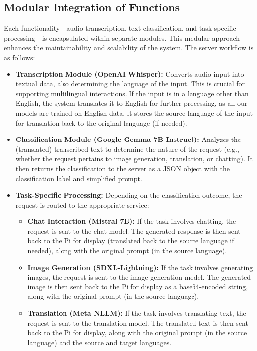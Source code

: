 \documentclass[12pt]{article}
\begin{document}
\subsection{Modular Integration of Functions}
Each functionality—audio transcription, text classification, and task-specific processing—is encapsulated within separate modules. This modular approach enhances the maintainability and scalability of the system. The server workflow is as follows:
\begin{itemize}
    \item \textbf{Transcription Module (OpenAI Whisper):} Converts audio input into textual data, also determining the language of the input. This is crucial for supporting multilingual interactions. If the input is in a language other than English, the system translates it to English for further processing, as all our models are trained on English data. It stores the source language of the input for translation back to the original language (if needed).\cite{radford2022whisper}
    \item \textbf{Classification Module (Google Gemma 7B Instruct):} Analyzes the (translated) transcribed text to determine the nature of the request (e.g., whether the request pertains to image generation, translation, or chatting). It then returns the classification to the server as a JSON object with the classification label and simplified prompt.\cite{gemmateam2024gemma}
    \item \textbf{Task-Specific Processing:} Depending on the classification outcome, the request is routed to the appropriate service:
    \begin{itemize}
		\item \textbf{Chat Interaction (Mistral 7B):} If the task involves chatting, the request is sent to the chat model. The generated response is then sent back to the Pi for display (translated back to the source language if needed), along with the original prompt (in the source language).\cite{jiang2023mistral,nllbteam2022language}
        \item \textbf{Image Generation (SDXL-Lightning):} If the task involves generating images, the request is sent to the image generation model. The generated image is then sent back to the Pi for display as a base64-encoded string, along with the original prompt (in the source language).
		\cite{lin2024sdxllightning}
        \item \textbf{Translation (Meta NLLM):} If the task involves translating text, the request is sent to the translation model. The translated text is then sent back to the Pi for display, along with the original prompt (in the source language) and the source and target languages.\cite{nllbteam2022language}
    \end{itemize}
\end{itemize}
\end{document}
